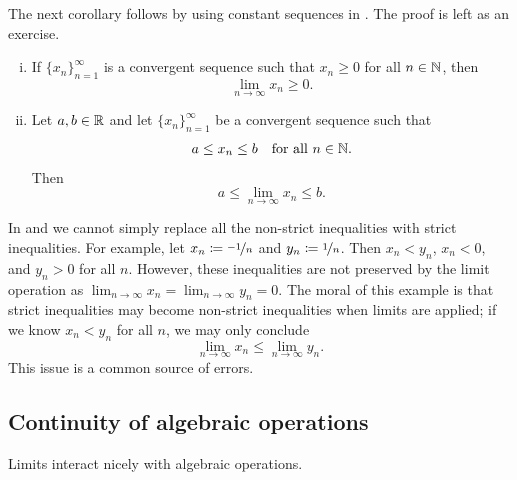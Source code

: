 The next corollary follows by
using constant sequences in
.  The proof is left as an exercise.

\begin{samepage}
\begin{cor} \label{limandineq:cor}
\leavevmode
\begin{enumerate}[(i)]
\item If $\{ x_n \}_{n=1}^\infty$ is a convergent sequence such that $x_n \geq 0$ for all
$n \in {\mathbb{N}}$,
then
\begin{equation*}
\lim_{n\to\infty} x_n \geq 0.
\end{equation*}
\item
Let $a,b \in {\mathbb{R}}$ and
let $\{ x_n \}_{n=1}^\infty$ be a convergent sequence such that
\begin{equation*}
a \leq x_n \leq b \quad \text{for all } n \in {\mathbb{N}} .
\end{equation*}
Then
\begin{equation*}
a \leq \lim_{n\to\infty} x_n \leq b.
\end{equation*}
\end{enumerate}
\end{cor}
\end{samepage}

In  and  we cannot simply replace
all the non-strict inequalities with
strict inequalities.  For example,
let $x_n \coloneqq \nicefrac{-1}{n}$ and $y_n \coloneqq \nicefrac{1}{n}$.
Then $x_n < y_n$, $x_n < 0$,
and $y_n > 0$ for all $n$.  However, these inequalities are
not preserved by the limit operation as
$\lim_{n\to\infty} x_n = \lim_{n\to\infty} y_n = 0$.
The moral of this example is that strict inequalities may become non-strict
inequalities when limits are applied; if we know
$x_n < y_n$ for all $n$,
we may only conclude 
\begin{equation*}
\lim_{n \to \infty} x_n \leq
\lim_{n \to \infty} y_n .
\end{equation*}
This issue is a common source of errors.

\subsection{Continuity of algebraic operations}

Limits interact nicely with algebraic operations.

